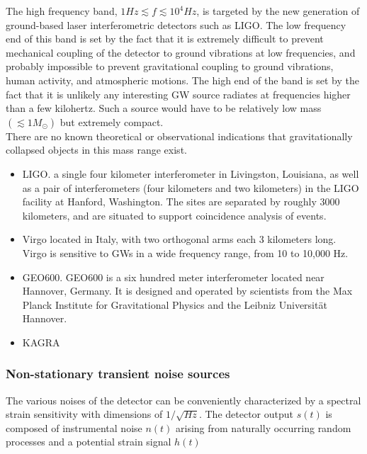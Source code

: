 \documentclass[binding=0.6cm, LaM]{sapthesis}
\begin{document}
	The high frequency band, $1Hz \apprle f \apprle 10^4 Hz$, is targeted by 
	the new generation of ground-based laser interferometric detectors such as LIGO.
	The low frequency end of this band is set by the fact that it is extremely difficult 
	to prevent mechanical coupling of the detector to ground vibrations at low frequencies,
	and probably impossible to prevent gravitational coupling to ground vibrations, human activity, and atmospheric motions.
	The high end of the band is set by the fact that it is unlikely any interesting GW source 
	radiates at frequencies higher than a few kilohertz. Such a source would have to be relatively
	low mass $(\apprle 1M_{\odot})$ but extremely compact. \\
	There are no known theoretical or observational indications that gravitationally collapsed objects in this mass range exist.

\begin{itemize}
			\item LIGO.
			      a single four kilometer interferometer in Livingston, Louisiana, 
			      as well as a pair of interferometers (four kilometers and two kilometers) in the LIGO facility at Hanford, Washington.
			      The sites are separated by roughly 3000 kilometers, and are situated to support coincidence analysis of events.
  			\item Virgo located in Italy, with two orthogonal arms each 3 kilometers long. 
			      Virgo is sensitive to GWs in a wide frequency range, from 10 to 10,000 Hz. 
  			\item GEO600. GEO600 is a six hundred meter interferometer located near Hannover, 
			      Germany. It is designed and operated by scientists from the 
			      Max Planck Institute for Gravitational Physics and the Leibniz Universität Hannover.
  			\item KAGRA 

\end{itemize}

\subsubsection{Non-stationary transient noise sources}
	
	The various noises of the detector can be conveniently characterized by a spectral strain
        sensitivity with dimensions of $1/\sqrt{Hz}$.
        The detector output $s(t)$ is composed of instrumental noise $n(t)$ arising from
        naturally occurring random processes and a potential strain signal $h(t)$
\end{document}
